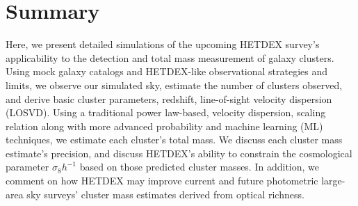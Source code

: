 \section{Summary}\label{sec:summary}
Here, we present detailed simulations of the upcoming HETDEX survey's applicability to the detection and total mass measurement of galaxy clusters. Using mock galaxy catalogs and HETDEX-like observational strategies and limits, we observe our simulated sky, estimate the number of clusters observed, and derive basic cluster parameters, redshift, line-of-sight velocity dispersion (LOSVD). Using a traditional power law-based, velocity dispersion, scaling relation along with more advanced probability and machine learning (ML) techniques, we estimate each cluster's total mass. We discuss each cluster mass estimate's precision, and discuss HETDEX's ability to constrain the cosmological parameter $\sigma_8 h^{-1}$ based on those predicted cluster masses. In addition, we comment on how HETDEX may improve current and future photometric large-area sky surveys' cluster mass estimates derived from optical richness.

